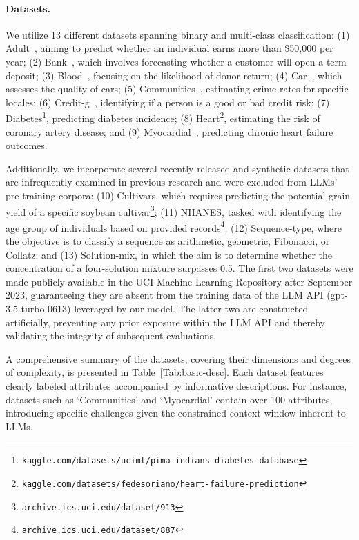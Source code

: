 \paragraph{Datasets.}
We utilize 13 different datasets spanning binary and multi-class classification: (1) Adult~\cite{asuncion2007uci}, aiming to predict whether an individual earns more than \$50,000 per year; (2) Bank~\cite{moro2014data}, which involves forecasting whether a customer will open a term deposit; (3) Blood~\cite{yeh2009knowledge}, focusing on the likelihood of donor return; (4) Car~\cite{kadra2021well}, which assesses the quality of cars; (5) Communities~\cite{misc_communities_and_crime_183}, estimating crime rates for specific locales; (6) Credit-g~\cite{kadra2021well}, identifying if a person is a good or bad credit risk; (7) Diabetes\footnote{\texttt{kaggle.com/datasets/uciml/pima-indians-diabetes-database}}, predicting diabetes incidence; (8) Heart\footnote{\texttt{kaggle.com/datasets/fedesoriano/heart-failure-prediction}}, estimating the risk of coronary artery disease; and (9) Myocardial~\cite{misc_myocardial_infarction_complications_579}, predicting chronic heart failure outcomes.

Additionally, we incorporate several recently released and synthetic datasets that are infrequently examined in previous research and were excluded from LLMs’ pre-training corpora: (10) Cultivars, which requires predicting the potential grain yield of a specific soybean cultivar\footnote{\texttt{archive.ics.uci.edu/dataset/913}}; (11) NHANES, tasked with identifying the age group of individuals based on provided records\footnote{\texttt{archive.ics.uci.edu/dataset/887}}; (12) Sequence-type, where the objective is to classify a sequence as arithmetic, geometric, Fibonacci, or Collatz; and (13) Solution-mix, in which the aim is to determine whether the concentration of a four-solution mixture surpasses 0.5. The first two datasets were made publicly available in the UCI Machine Learning Repository after September 2023, guaranteeing they are absent from the training data of the LLM API (gpt-3.5-turbo-0613) leveraged by our model. The latter two are constructed artificially, preventing any prior exposure within the LLM API and thereby validating the integrity of subsequent evaluations.

A comprehensive summary of the datasets, covering their dimensions and degrees of complexity, is presented in Table~\ref{Tab:basic-desc}.
Each dataset features clearly labeled attributes accompanied by informative descriptions. For instance, datasets such as ‘Communities’ and ‘Myocardial’ contain over 100 attributes, introducing specific challenges given the constrained context window inherent to LLMs.

